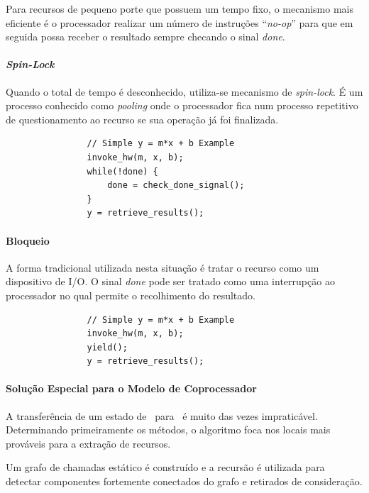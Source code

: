 			Para recursos de pequeno porte que possuem um tempo fixo, o mecanismo mais eficiente é o processador realizar um número de instruções ``\textit{no-op}'' para que em seguida possa receber o resultado sempre checando o sinal \textit{done}.



		\paragraph{\textit{Spin-Lock}}

			Quando o total de tempo é desconhecido, utiliza-se mecanismo de \textit{spin-lock}. É um processo conhecido como \textit{pooling} onde o processador fica num processo repetitivo de questionamento ao recurso se sua operação já foi finalizada.



			\begin{verbatim}
				// Simple y = m*x + b Example
				invoke_hw(m, x, b);
				while(!done) {
				    done = check_done_signal();
				}
				y = retrieve_results();
			\end{verbatim}



		\paragraph{Bloqueio}

			A forma tradicional utilizada nesta situação é tratar o recurso como um dispositivo de I/O. O sinal \textit{done} pode ser tratado como uma interrupção ao processador no qual permite o recolhimento do resultado.

			\begin{verbatim}
				// Simple y = m*x + b Example
				invoke_hw(m, x, b);
				yield();
				y = retrieve_results();
			\end{verbatim}



		\paragraph{Solução Especial para o Modelo de Coprocessador}

			A transferência de um estado de \hardware\ para \software\ é muito das vezes impraticável. Determinando primeiramente os métodos, o algoritmo foca nos locais mais prováveis para a extração de recursos.

			Um grafo de chamadas estático é construído e a recursão é utilizada para detectar componentes fortemente conectados do grafo e retirados de consideração.


